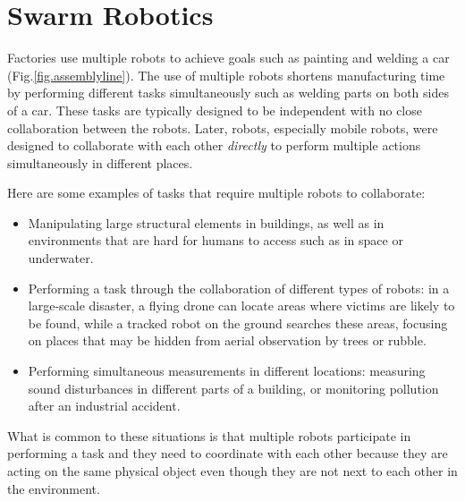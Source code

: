 
\chapter{Swarm Robotics}\label{ch.swarm}


Factories use multiple robots to achieve goals such as painting and welding a car (Fig.\ref{fig.assemblyline}). The use of multiple robots shortens manufacturing time by performing different tasks simultaneously such as welding parts on both sides of a car. These tasks are typically designed to be independent with no close collaboration between the robots. Later, robots, especially mobile robots, were designed to collaborate with each other \emph{directly} to perform multiple actions simultaneously in different places.

Here are some examples of tasks that require multiple robots to collaborate:
\begin{itemize}
\item Manipulating large structural elements in buildings, as well as in environments that are hard for humans to access such as in space or underwater.
\item Performing a task through the collaboration of different types of robots: in a large-scale disaster, a flying drone can locate areas where victims are likely to be found, while a tracked robot on the ground searches these areas, focusing on places that may be hidden from aerial observation by trees or rubble.
\item Performing simultaneous measurements in different locations: measuring sound disturbances in different parts of a building, or monitoring pollution after an industrial accident. 
\end{itemize}
What is common to these situations is that multiple robots participate in performing a task and they need to coordinate with each other because they are acting on the same physical object even though they are not next to each other in the environment. 

